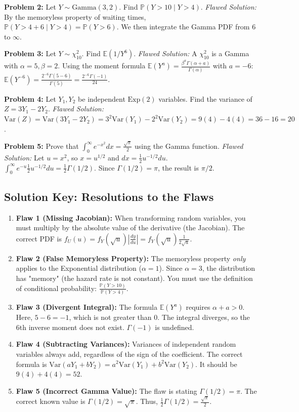 \documentclass[11pt, a4paper]{article}
\theoremstyle{definition}
\theoremstyle{remark}
\newcommand{\E}{\mathbb{E}}
\newcommand{\Prob}{\mathbb{P}}
\begin{document}
\textbf{Problem 2:} Let $Y \sim \text{Gamma}(3, 2)$. Find $\Prob(Y > 10 \mid Y > 4)$.
\textit{Flawed Solution:} By the memoryless property of waiting times, $\Prob(Y > 4 + 6 \mid Y > 4) = \Prob(Y > 6)$. We then integrate the Gamma PDF from 6 to $\infty$.

\textbf{Problem 3:} Let $Y \sim \chi^2_{10}$. Find $\E(1/Y^6)$.
\textit{Flawed Solution:} A $\chi^2_{10}$ is a Gamma with $\alpha = 5, \beta = 2$. Using the moment formula $\E(Y^a) = \frac{\beta^a \Gamma(\alpha+a)}{\Gamma(\alpha)}$ with $a = -6$:
$\E(Y^{-6}) = \frac{2^{-6} \Gamma(5 - 6)}{\Gamma(5)} = \frac{2^{-6} \Gamma(-1)}{24}$.

\textbf{Problem 4:} Let $Y_1, Y_2$ be independent $\text{Exp}(2)$ variables. Find the variance of $Z = 3Y_1 - 2Y_2$.
\textit{Flawed Solution:} $\text{Var}(Z) = \text{Var}(3Y_1 - 2Y_2) = 3^2\text{Var}(Y_1) - 2^2\text{Var}(Y_2) = 9(4) - 4(4) = 36 - 16 = 20$.

\textbf{Problem 5:} Prove that $\int_0^\infty e^{-x^2} dx = \frac{\sqrt{\pi}}{2}$ using the Gamma function.
\textit{Flawed Solution:} Let $u = x^2$, so $x = u^{1/2}$ and $dx = \frac{1}{2}u^{-1/2} du$.
$\int_0^\infty e^{-u} \frac{1}{2}u^{-1/2} du = \frac{1}{2} \Gamma(1/2)$. Since $\Gamma(1/2) = \pi$, the result is $\pi/2$.

\hrulefill

\subsection*{Solution Key: Resolutions to the Flaws}
\begin{enumerate}
    \item \textbf{Flaw 1 (Missing Jacobian):} When transforming random variables, you must multiply by the absolute value of the derivative (the Jacobian). The correct PDF is $f_U(u) = f_Y(\sqrt{u}) \left| \frac{dy}{du} \right| = f_Y(\sqrt{u}) \frac{1}{2\sqrt{u}}$.
    \item \textbf{Flaw 2 (False Memoryless Property):} The memoryless property \textit{only} applies to the Exponential distribution ($\alpha=1$). Since $\alpha=3$, the distribution has "memory" (the hazard rate is not constant). You must use the definition of conditional probability: $\frac{\Prob(Y > 10)}{\Prob(Y > 4)}$.
    \item \textbf{Flaw 3 (Divergent Integral):} The formula $\E(Y^a)$ requires $\alpha + a > 0$. Here, $5 - 6 = -1$, which is not greater than 0. The integral diverges, so the 6th inverse moment does not exist. $\Gamma(-1)$ is undefined.
    \item \textbf{Flaw 4 (Subtracting Variances):} Variances of independent random variables always add, regardless of the sign of the coefficient. The correct formula is $\text{Var}(aY_1 + bY_2) = a^2\text{Var}(Y_1) + b^2\text{Var}(Y_2)$. It should be $9(4) + 4(4) = 52$.
    \item \textbf{Flaw 5 (Incorrect Gamma Value):} The flaw is stating $\Gamma(1/2) = \pi$. The correct known value is $\Gamma(1/2) = \sqrt{\pi}$. Thus, $\frac{1}{2}\Gamma(1/2) = \frac{\sqrt{\pi}}{2}$.
\end{enumerate}
\end{document}
